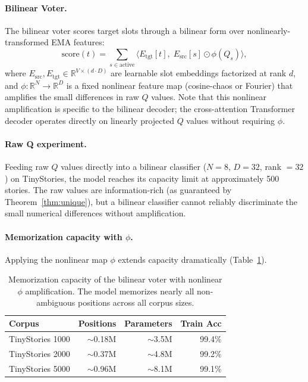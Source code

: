 \documentclass[11pt]{article}
\begin{document}
\paragraph{Bilinear Voter.}
The bilinear voter scores target slots through a bilinear form over nonlinearly-transformed EMA features:
\begin{equation}
\text{score}(t) = \sum_{s \in \text{active}} \langle E_{\text{tgt}}[t],\; E_{\text{src}}[s] \odot \phi(Q_s) \rangle,
\end{equation}
where $E_{\text{src}}, E_{\text{tgt}} \in \mathbb{R}^{V \times (d \cdot D)}$ are learnable slot embeddings factorized at rank $d$, and $\phi: \mathbb{R}^N \to \mathbb{R}^D$ is a fixed nonlinear feature map (cosine-chaos or Fourier) that amplifies the small differences in raw $Q$ values. Note that this nonlinear amplification is specific to the bilinear decoder; the cross-attention Transformer decoder operates directly on linearly projected $Q$ values without requiring $\phi$.

\paragraph{Raw Q experiment.}
Feeding raw $Q$ values directly into a bilinear classifier ($N = 8$, $D = 32$, rank $= 32$) on TinyStories, the model reaches its capacity limit at approximately 500 stories. The raw values are information-rich (as guaranteed by Theorem~\ref{thm:unique}), but a bilinear classifier cannot reliably discriminate the small numerical differences without amplification.

\paragraph{Memorization capacity with $\phi$.}
Applying the nonlinear map $\phi$ extends capacity dramatically (Table~\ref{tab:bilinear}).

\begin{table}[h]
\centering
\begin{tabular}{l r r r}
\toprule
Corpus & Positions & Parameters & Train Acc \\
\midrule
TinyStories 1000 & $\sim$0.18M & $\sim$3.5M & 99.4\% \\
TinyStories 2000 & $\sim$0.37M & $\sim$4.8M & 99.2\% \\
TinyStories 5000 & $\sim$0.96M & $\sim$8.1M & 99.1\% \\
\bottomrule
\end{tabular}
\caption{Memorization capacity of the bilinear voter with nonlinear $\phi$ amplification. The model memorizes nearly all non-ambiguous positions across all corpus sizes.}
\label{tab:bilinear}
\end{table}
\end{document}
